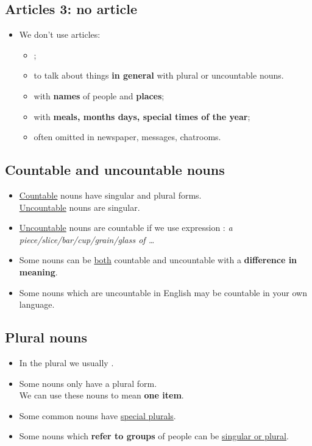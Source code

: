 \subsection{Articles 3: no article}
\begin{itemize}
    \item We don't use articles:
    \begin{itemize}
        \item[\daash] ;
        \item to talk about things \textbf{in general} with plural or uncountable nouns.
        \item with \textbf{names} of people and \textbf{places};
        \item[\daash] with \textbf{meals, months days, special times of the year};
        \item[\aast] often omitted in newspaper, messages, chatrooms.
    \end{itemize}
\end{itemize}

\subsection{Countable and uncountable nouns}
\begin{itemize}
    \item \underline{Countable} nouns have singular and plural forms.\\
    \underline{Uncountable} nouns are singular.
    \item \underline{Uncountable} nouns are countable if we use expression :
    \textit{a piece\slash{}slice\slash{}bar\slash{}cup\slash{}grain\slash{}glass of \ldots}
    \item Some nouns can be \underline{both} countable and uncountable with a \textbf{difference in meaning}.
    \item[\ast] Some nouns which are uncountable in English may be countable in your own language.
\end{itemize}

\subsection{Plural nouns}
\begin{itemize}
    \item In the plural we usually .
    \item Some nouns only have a plural form.\\
    We can use   these nouns to mean \textbf{one item}.
    \item Some common nouns have \underline{special plurals}.
    \item Some nouns which \textbf{refer to groups} of people can be \underline{singular or plural}.
\end{itemize}

